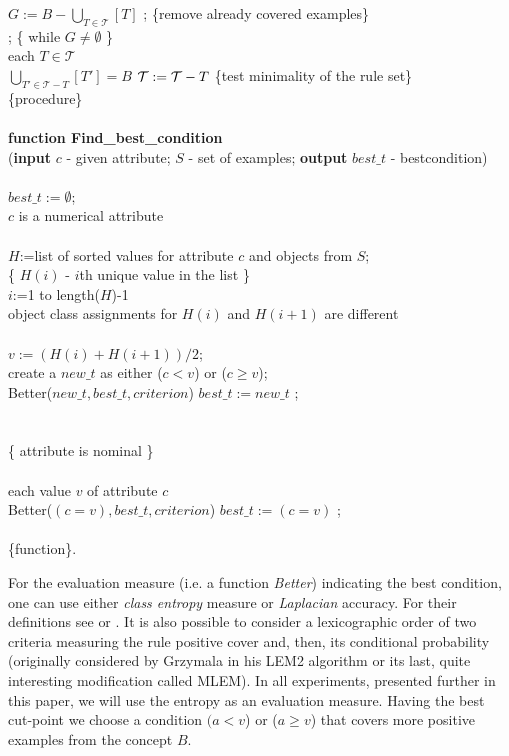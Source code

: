 \documentclass{llncs}
\begin{document}
\begin{algo}
 $G:=B - \bigcup_{T \in \mathcal{T}}\left[ T \right]$ ; \{remove already covered examples\}\\
\< \E; \{ while $G \neq \emptyset$ \}\\ \< \FOR each $T \in \mathcal{T}$ \DO
\\
 \IF $\bigcup_{T' \in \mathcal{T}-T}\left[ T' \right] = B$ \THEN
   $\mathcal{T}:={\cal T} - T$ \{test minimality of the rule set\} \\
\< \< \E  \> \{procedure\}\\
\\
\< \< {\bf function Find\_best\_condition} \\ \< \<   ({\bf input} $c$ -
given attribute; $S$ - set of examples; {\bf output}
    $best\_t$ - bestcondition) \\
\< \< \B      \\ \<  $best\_t:=\emptyset$; \\ \<  \IF $c$ is a numerical
attribute \THEN \\ \<  \B \\
    $H$:=list of sorted values for attribute $c$ and objects from $S$;\\
    \{ $H(i)$ - $i$th unique value in the list \} \\
    \FOR  $i$:=1 to length($H$)-1 \DO \\
   \IF object class assignments for $H(i)$ and $H(i+1)$ are different
   \THEN \\
   \B \\
\> $v:=(H(i)+H(i+1))/2$; \\ \> create a $new\_t$ as either  ($c < v$) or ($c
\geq v$); \\ \> \IF Better($new\_t,best\_t,criterion$) \THEN
$best\_t:=new\_t$ ; \\ \E \\ \< \E \\ \< \ELSE \{ attribute is nominal \} \\
\< \B \\
 \FOR each value $v$ of attribute $c$ \DO \\
 \IF Better($(c=v),best\_t,criterion$) \THEN $best\_t:=(c=v)$ ; \\
\< \E \\ \< \< \E \> \{function\}.
\end{algo}

For the evaluation measure (i.e. a function {\em Better}) indicating the
best condition, one can use either {\em class entropy} measure  or {\em
Laplacian} accuracy. For their definitions see  \cite{GrzymStef} or
\cite{Mitchell}. It is also possible to consider a lexicographic order of
two criteria measuring the rule positive cover and, then, its conditional
probability (originally considered by Grzymala in his LEM2 algorithm or its
last, quite interesting modification called MLEM). In all experiments,
presented further in this paper, we will use the entropy as an evaluation
measure. Having the best cut-point we choose a condition $(a < v$) or ($a
\geq v$) that covers more positive examples from the concept $B$.
\end{document}
